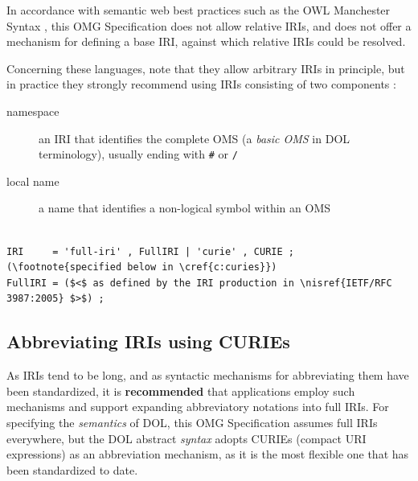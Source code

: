 \documentclass[10pt,fleqn,%
\ifpretendfinal
final%
\else
draft%
\fi,
]{scrreprt}
\makeatletter
\newcommand*\CommentAuthor{}
\renewcommand*\CommentAuthor{#1}}
\newcommand*\CommentDate{}
\renewcommand*\CommentDate{#1}}
\newcommand*\CommentId{}
\renewcommand*\CommentId{#1}}
\newcommand*\CommentType{}
\renewcommand*\CommentType{#1}}
\newcommand*{\SetCommentColorByType}[1]{%
\edef\localType{{#1}}%
\expandafter\ifstrequal\localType{q-aut}{\colorlet{CommentColor}{red}}{%
\expandafter\ifstrequal\localType{q-all}{\colorlet{CommentColor}{orange}}{%
\expandafter\ifstrequal\localType{todo}{\colorlet{CommentColor}{orange}}{%
\expandafter\ifstrequal\localType{fyi}{\colorlet{CommentColor}{lightgray}}{%
\colorlet{CommentColor}{yellow}}}}}}
\newcommand*{\SetCommentPrefixByType}[1]{%
\edef\localType{{#1}}%
\expandafter\@ifmtarg\localType{%
\edef\CommentPrefix{}%
}{%
\caseupper[q]{#1}%
\edef\CommentPrefix{\thestring: }%
}}
\newcommand*{\initComment}[1]{%
\setkeys{Comment}{#1}%
\SetCommentColorByType{\CommentType}%
\relax%
\SetCommentPrefixByType{\CommentType}%
\relax%
}
\newcommand*{\todonote}[2][]{%
\initComment{#1}%
\pdfcomment[author=\CommentAuthor,color=CommentColor,date=\CommentDate,id=\CommentId]{%
\CommentPrefix
#2}}
\renewcommand*{\todonote}[2][]{%
\initComment{#1}%
\ednote{\CommentPrefix #2}}
\newcommand*{\syntax}[1]{\texttt{#1}}
\newcommand*{\recommended}{\textbf{recommended}\xspace}
\newcommand*{\IS}{OMG Specification\xspace}
\newcommand{\clauserefname}{clause}
\newcommand{\cref}[1]{\clauserefname~\ref{#1}}
\newcommand{\ssclause}[1]{\subsection{#1}}
\newcommand{\nisref}[1]{#1}
\makeatother
\begin{document}

In accordance with semantic web best practices such as the OWL Manchester Syntax 
\cite{W3C:NOTE-owl2-manchester-syntax-20091027}, this \IS does not allow relative IRIs, and does 
not offer a mechanism for defining a base IRI, against which relative IRIs could be resolved.

Concerning these languages, note that they allow arbitrary IRIs in principle, but in practice they 
strongly recommend using IRIs consisting of two components \cite{W3C:NOTE-swbp-vocab-pub-20080828}:
\begin{description}
\item[namespace] an IRI that identifies the complete OMS (a \emph{basic OMS} in DOL terminology), 
usually ending with \syntax{\#} or \syntax{/}
\item[local name] a name that identifies a non-logical symbol within an OMS
\end{description}

\begin{lstlisting}[language=ebnf,escapeinside={()}]  % abstract syntax

IRI     = 'full-iri' , FullIRI | 'curie' , CURIE ; (\footnote{specified below in \cref{c:curies}}) 
FullIRI = ($<$ as defined by the IRI production in \nisref{IETF/RFC 3987:2005} $>$) ;
\end{lstlisting}

\ssclause{Abbreviating IRIs using CURIEs}\label{c:curies}

As IRIs tend to be long, and as syntactic mechanisms for abbreviating them have been standardized, 
it is \recommended that applications employ such mechanisms and support expanding abbreviatory
notations into full IRIs.  For specifying the \emph{semantics} of DOL, this \IS assumes full IRIs 
everywhere, but the DOL abstract \emph{syntax} adopts CURIEs (compact URI expressions) as an 
abbreviation mechanism, as it is the most flexible one that has been standardized to date.  
\end{document}
